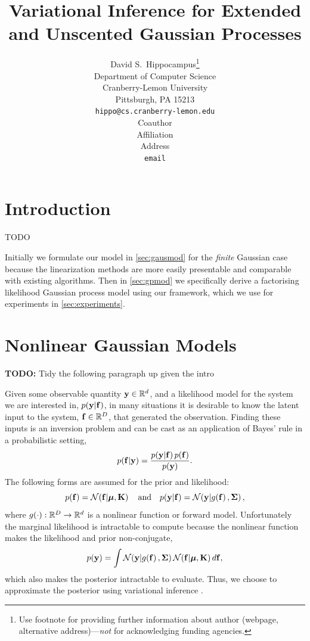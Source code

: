 \documentclass{article} %
\title{Variational Inference for Extended and Unscented Gaussian Processes}
\author{
David S.~Hippocampus\thanks{Use footnote for providing further information
about author (webpage, alternative address)---\emph{not} for acknowledging
funding agencies.} \\
Department of Computer Science\\
Cranberry-Lemon University\\
Pittsburgh, PA 15213 \\
\texttt{hippo@cs.cranberry-lemon.edu} \\
\And
Coauthor \\
Affiliation \\
Address \\
\texttt{email} \\
}
\begin{document}
\maketitle

\begin{abstract}
\end{abstract}

\section{Introduction}

TODO

Initially we formulate our model in \autoref{sec:gausmod} for the \emph{finite}
Gaussian case because the linearization methods are more easily presentable and
comparable with existing algorithms. Then in \autoref{sec:gpmod} we
specifically derive a factorising likelihood Gaussian process model using our
framework, which we use for experiments in \autoref{sec:experiments}.


\section{Nonlinear Gaussian Models}
\label{sec:gausmod}

\textbf{TODO:} Tidy the following paragraph up given the intro

Given some observable quantity $\mathbf{y} \in \mathbb{R}^{d}$, and a likelihood model for
the system we are interested in, $p\!\left({\mathbf{y}}\middle\vert{\ensuremath{\mathbf{f}}}\right)$, in many situations it
is desirable to know the latent input to the system, $\mathbf{f}\in\mathbb{R}^{D}$, that
generated the observation. Finding these inputs is an inversion problem and can
be cast as an application of Bayes' rule in a probabilistic setting,
\begin{equation}
    p\!\left({\mathbf{f}}\middle\vert{\ensuremath{\mathbf{y}}}\right) = \frac{p\!\left({\mathbf{y}}\middle\vert{\ensuremath{\mathbf{f}}}\right)p\!\left({\mathbf{f}}\right)}
        {p\!\left({\mathbf{y}}\right)}.
    \label{eq:bayesrule}
\end{equation}
The following forms are assumed for the prior and likelihood:
\begin{equation}
    p\!\left({\mathbf{f}}\right) = \mathcal{N}\!\left({\mathbf{f}}\middle\vert{\ensuremath{\boldsymbol{\mu}}, \ensuremath{\mathbf{K}}}\right)
    \quad \text{and} \quad
    p\!\left({\mathbf{y}}\middle\vert{\ensuremath{\mathbf{f}}}\right) = \mathcal{N}\!\left({\mathbf{y}}\middle\vert{\ensuremath{g\!\left({{\mathbf{f}}}\right)}, \ensuremath{\boldsymbol{\Sigma}}}\right),
    \label{eq:priorlike}
\end{equation}
where $g\!\left({{\cdot}}\right) : \mathbb{R}^{D} \to \mathbb{R}^{d}$ is a nonlinear function or
forward model. Unfortunately the marginal likelihood is intractable to compute
because the nonlinear function makes the likelihood and prior non-conjugate,
\begin{equation}
    p\!\left({\mathbf{y}}\right) = \int \mathcal{N}\!\left({\mathbf{y}}\middle\vert{\ensuremath{g\!\left({{\mathbf{f}}}\right)}, \ensuremath{\boldsymbol{\Sigma}}}\right)
        \mathcal{N}\!\left({\mathbf{f}}\middle\vert{\ensuremath{\boldsymbol{\mu}}, \ensuremath{\mathbf{K}}}\right) d\mathbf{f},
    \label{eq:marglike}
\end{equation}
which also makes the posterior intractable to evaluate. Thus, we choose to
approximate the posterior using variational inference \cite{Jordan1999}.
\end{document}
